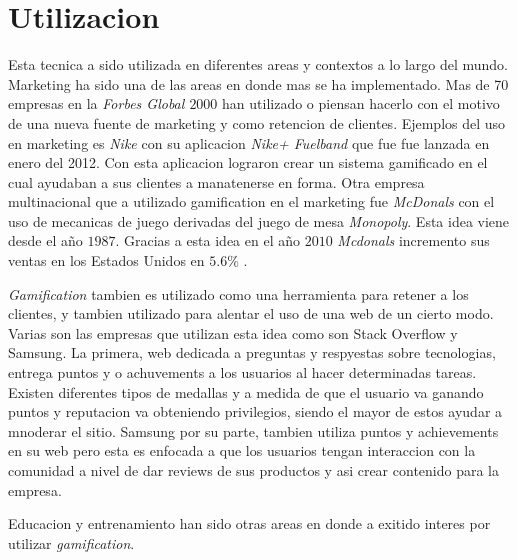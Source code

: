 \section{Utilizacion}

Esta tecnica a sido utilizada en diferentes areas y contextos a lo largo del mundo. Marketing ha sido una 
de las areas en donde mas se ha implementado. Mas de 70 empresas en la \emph{Forbes Global $2000$} han
utilizado o piensan hacerlo con el motivo de una nueva fuente de marketing y como retencion de 
clientes\cite{Gam:Util:1}. Ejemplos del uso en marketing es \emph{Nike} con su aplicacion \emph{Nike+ Fuelband} que
fue fue lanzada en enero del 2012\cite{Gam:Util:2}. Con esta aplicacion lograron crear un sistema 
gamificado en el cual ayudaban a sus clientes a manatenerse en forma. Otra empresa multinacional que a utilizado
gamification en el marketing fue \emph{McDonals} con el uso de mecanicas de juego derivadas del juego de mesa 
\emph{Monopoly}. Esta idea viene desde el año $1987$. Gracias a esta idea en el año $2010$ \emph{Mcdonals} 
incremento sus ventas en los Estados Unidos en $5.6\%$ \cite{Gam:Util:2}.


\emph{Gamification} tambien es utilizado como una herramienta para retener a los clientes, y tambien utilizado 
para alentar el uso de una web de un cierto modo. Varias son las empresas que utilizan esta idea como son 
Stack Overflow y Samsung. La primera, web dedicada a preguntas y respyestas sobre tecnologias, entrega puntos y o 
achuvements a los usuarios al hacer determinadas tareas. Existen diferentes tipos de medallas y a medida de que el usuario va ganando puntos y reputacion va obteniendo privilegios, siendo el mayor de estos ayudar a mnoderar el sitio.
Samsung por su parte, tambien utiliza puntos y achievements en su web pero esta es enfocada a que los usuarios 
tengan interaccion con la comunidad a nivel de dar reviews de sus productos y asi crear contenido para la
empresa\cite{Gam:Util:3}.

Educacion y entrenamiento han sido otras areas en donde a exitido interes por utilizar \emph{gamification}.

